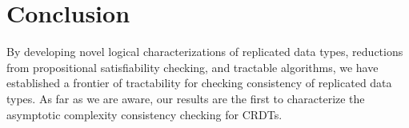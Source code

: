 \section{Conclusion}
\label{sec:crdt:conclusion}

By developing novel logical characterizations of replicated data types, reductions from propositional satisfiability checking, and tractable algorithms, we have established a frontier of tractability for checking consistency of replicated data types. As far as we are aware, our results are the first to characterize the asymptotic complexity consistency checking for CRDTs.
